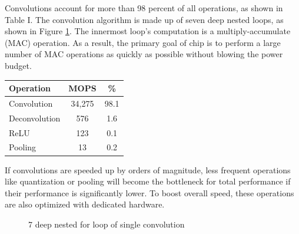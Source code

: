 \documentclass[letterpaper, 10 pt, conference]{ieeeconf}  %
\begin{document}
Convolutions account for more than 98 percent of all operations, as shown in Table I. The convolution algorithm is made up of seven deep nested loops, as shown in Figure \ref{seven_deep_nested}. The innermost loop's computation is a multiply-accumulate (MAC) operation\cite{fsd_computer}. As a result, the primary goal of chip is to perform a large number of MAC operations as quickly as possible without blowing the power budget.

\begin{table}[hbt!]
\centering
\begin{tabular}{@{}lcc@{}}
\toprule
Operation                     & MOPS                     & \%                       \\ \midrule
\multicolumn{1}{|l|}{Convolution}   & \multicolumn{1}{c|}{34,275} & \multicolumn{1}{c|}{98.1} \\ \midrule
\multicolumn{1}{|l|}{Deconvolution} & \multicolumn{1}{c|}{576}    & \multicolumn{1}{c|}{1.6}  \\ \midrule
\multicolumn{1}{|l|}{ReLU}    & \multicolumn{1}{c|}{123} & \multicolumn{1}{c|}{0.1} \\ \midrule
\multicolumn{1}{|l|}{Pooling} & \multicolumn{1}{c|}{13}  & \multicolumn{1}{c|}{0.2} \\ \bottomrule
\end{tabular}
\label{tab:cnn_operation}
\end{table}

If convolutions are speeded up by orders of magnitude, less frequent operations like quantization or pooling will become the bottleneck for total performance if their performance is significantly lower. To boost overall speed, these operations are also optimized with dedicated hardware\cite{fsd_computer}.


   \begin{figure}[thpb]
      \centering
      \caption{7 deep nested for loop of single convolution}
      \label{seven_deep_nested}
   \end{figure}
   
\end{document}
